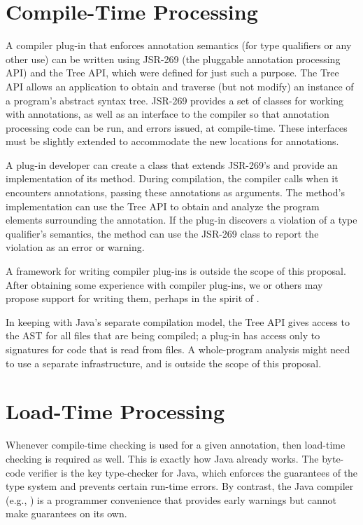 \documentclass[10pt]{article}
\begin{document}
\section{Compile-Time Processing}
\label{sec:compile-time}

A compiler plug-in that enforces annotation semantics (for type qualifiers
or any other use) can be written using JSR-269 (the pluggable annotation
processing API) and the Tree API, which were defined for just such a
purpose.  The Tree API allows an application to obtain and traverse (but
not modify) an instance of a program's abstract syntax tree.  JSR-269
provides a set of classes for working with annotations, as well as an
interface to the compiler so that annotation processing code can be run,
and errors issued, at compile-time.  These interfaces must be slightly
extended to accommodate the new locations for annotations.

A plug-in developer can create a
class that extends JSR-269's  and provide an
implementation of its  method. During compilation, the
compiler calls  when it encounters annotations, passing
these annotations as arguments. The  method's
implementation can use the Tree API to obtain and analyze the program
elements surrounding the annotation. If the plug-in discovers a
violation of a type qualifier's semantics, the  method
can use the JSR-269  class to report the violation as
an error or warning.

A framework for writing compiler plug-ins is outside the scope of this
proposal.  After obtaining some experience with compiler plug-ins, we or
others may propose support for writing them, perhaps
in the spirit of \cite{ChinMM2005}.

In keeping with Java's separate compilation model, the Tree API gives
access to the AST for all  files that are being compiled; a
plug-in has access only to signatures for code that is read from 
files.  A whole-program analysis might need to use a separate
infrastructure, and is outside the scope of this proposal.


\section{Load-Time Processing}
\label{sec:load-time}

Whenever compile-time checking is used for a given annotation, then
load-time checking is required as well.  This is exactly how Java already
works.  The byte-code verifier is the key type-checker for Java, which
enforces the guarantees of the type system and prevents certain run-time
errors.  By contrast, the Java compiler (e.g., ) is a
programmer convenience that provides early warnings but cannot make
guarantees on its own.
\end{document}
